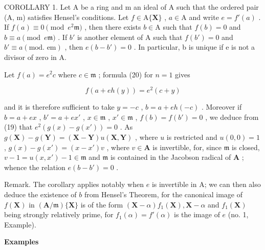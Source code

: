 COROLLARY 1. Let A be a ring and m an ideal of A such that the ordered pair (A, m) satisfies Hensel's conditions. Let \(f \in \mathrm{A}\{\mathbf{X}\}\) , \(a \in \mathrm{A}\) and write \(e = f'(a)\) . If \(f(a) \equiv 0 \pmod{e^2\mathfrak{m}}\) , then there exists \(b \in \mathrm{A}\) such that \(f(b) = 0\) and \(b \equiv a \pmod{e\mathfrak{m}}\) . If \(b'\) is another element of A such that \(f(b') = 0\) and \(b' \equiv a (\text{mod. em})\) , then \(e(b - b') = 0\) . In particular, b is unique if e is not a divisor of zero in A.

Let \(f(a) = e^{2}c\) where \(c \in \mathfrak{m}\) ; formula (20) for \(n = 1\) gives

\[
f (a + e h (y)) = e ^ {2} (c + y)
\]

and it is therefore sufficient to take \(y = -c\) , \(b = a + eh(-c)\) . Moreover if \(b = a + ex\) , \(b' = a + ex'\) , \(x \in \mathfrak{m}\) , \(x' \in \mathfrak{m}\) , \(f(b) = f(b') = 0\) , we deduce from (19) that \(e^2(g(x) - g(x')) = 0\) . As \(g(\mathbf{X}) - g(\mathbf{Y}) = (\mathbf{X} - \mathbf{Y})u(\mathbf{X}, \mathbf{Y})\) , where \(u\) is restricted and \(u(0,0) = 1\) , \(g(x) - g(x') = (x - x')v\) , where \(v \in \mathbf{A}\) is invertible, for, since \(\mathfrak{m}\) is closed, \(v - 1 = u(x,x') - 1 \in \mathfrak{m}\) and \(\mathfrak{m}\) is contained in the Jacobson radical of \(\mathbf{A}\) ; whence the relation \(e(b - b') = 0\) .

Remark. The corollary applies notably when \(e\) is invertible in A; we can then also deduce the existence of \(b\) from Hensel's Theorem, for the canonical image of \(f(\mathbf{X})\) in \((\mathbf{A} / \mathfrak{m})\{\mathbf{X}\}\) is of the form \((\mathbf{X} - \alpha)f_1(\mathbf{X}), \mathbf{X} - \alpha\) and \(f_1(\mathbf{X})\) being strongly relatively prime, for \(f_1(\alpha) = f'(\alpha)\) is the image of \(e\) (no. 1, Example).

\textbf{Examples}\par

